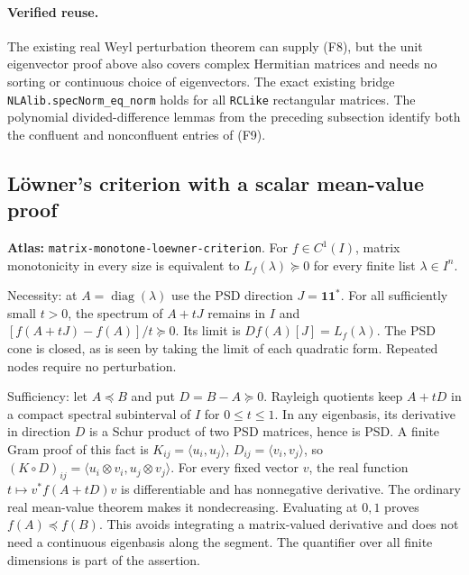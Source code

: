 \documentclass[11pt,a4paper]{article}
\DeclareMathOperator{\diag}{diag}
\DeclareRobustCommand{\code}[1]{{\footnotesize\urlstyle{tt}\nolinkurl{#1}}}
\begin{document}
\paragraph{Verified reuse.}
The existing real Weyl perturbation theorem can supply (F8), but the unit
eigenvector proof above also covers complex Hermitian matrices and needs no
sorting or continuous choice of eigenvectors. The exact existing bridge
\code{NLAlib.specNorm_eq_norm} holds for all \code{RCLike} rectangular
matrices. The polynomial divided-difference lemmas from the preceding
subsection identify both the confluent and nonconfluent entries of (F9).

\subsection{L\"owner's criterion with a scalar mean-value proof}
\label{sec:matrix-monotone-loewner-criterion}
\textbf{Atlas:} \code{matrix-monotone-loewner-criterion}.
For $f\in C^1(I)$, matrix monotonicity in every size is equivalent to
$L_f(\lambda)\succeq0$ for every finite list $\lambda\in I^n$.

Necessity: at $A=\diag(\lambda)$ use the PSD direction $J=\boldsymbol1
\boldsymbol1^*$. For all sufficiently small $t>0$, the spectrum of $A+tJ$
remains in $I$ and
$[f(A+tJ)-f(A)]/t\succeq0$. Its limit is
$Df(A)[J]=L_f(\lambda)$. The PSD cone is closed, as is seen by taking the
limit of each quadratic form. Repeated nodes require no perturbation.

Sufficiency: let $A\preceq B$ and put $D=B-A\succeq0$.
Rayleigh quotients keep $A+tD$ in a compact spectral subinterval of $I$
for $0\le t\le1$. In any eigenbasis, its derivative in direction $D$
is a Schur product of two PSD matrices, hence is PSD. A finite Gram proof
of this fact is $K_{ij}=\langle u_i,u_j\rangle$,
$D_{ij}=\langle v_i,v_j\rangle$, so
$(K\circ D)_{ij}=\langle u_i\otimes v_i,u_j\otimes v_j\rangle$.
For every fixed vector $v$, the real function
$t\mapsto v^*f(A+tD)v$ is differentiable and has nonnegative derivative.
The ordinary real mean-value theorem makes it nondecreasing. Evaluating at
$0,1$ proves $f(A)\preceq f(B)$. This avoids integrating a matrix-valued
derivative and does not need a continuous eigenbasis along the segment.
The quantifier over all finite dimensions is part of the assertion.
\end{document}
